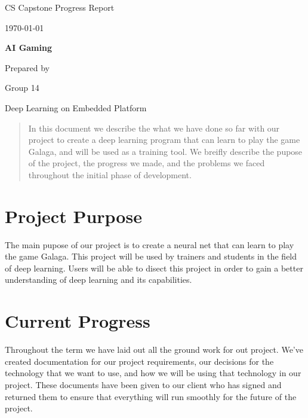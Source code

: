 \documentclass[onecolumn, draftclsnofoot,10pt, compsoc]{IEEEtran}
\def \CapstoneTeamName{		Deep Learning on Embedded Platform}
\def \CapstoneTeamNumber{		14}
\def \CapstoneProjectName{		AI Gaming}
\def \DocType{	%
				Progress Report
				}
\begin{document}
\begin{titlepage}
    \begin{singlespace}
        \hfill
        \par\vspace{.2in}
        \centering
        \scshape{
            \huge CS Capstone \DocType \par
            {\large\today}\par
            \vspace{.5in}
            \textbf{\Huge\CapstoneProjectName}\par
            {\large Prepared by }\par
            Group\CapstoneTeamNumber\par
            \CapstoneTeamName\par
            \vspace{5pt}
        }
        \begin{abstract}
        In this document we describe the what we have done so far with our project to create a deep learning program that can learn to play the game Galaga, and will be used as a training tool.
		We breifly describe the pupose of the project, the progress we made, and the problems we faced throughout the initial phase of development.
		
        \end{abstract}
    \end{singlespace}
\end{titlepage}

\newpage
{}
\tableofcontents

\section{Project Purpose}
The main pupose of our project is to create a neural net that can learn to play the game Galaga.
This project will be used by trainers and students in the field of deep learning.
Users will be able to disect this project in order to gain a better understanding of deep learning and its capabilities.

\section{Current Progress}
Throughout the term we have laid out all the ground work for out project.
We've created documentation for our project requirements, our decisions for the technology that we want to use, and how we will be using that technology in our project.
These documents have been given to our client who has signed and returned them to ensure that everything will run smoothly for the future of the project.
\end{document}
